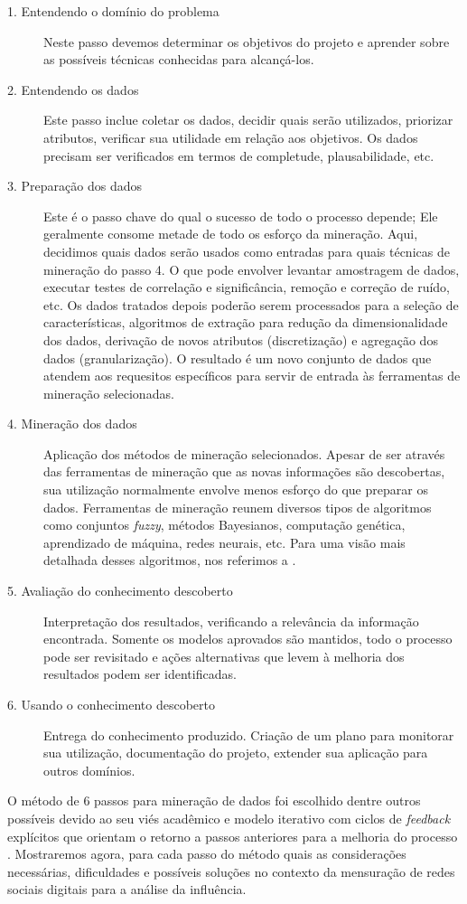 \documentclass{article}
\begin{document}
\begin{description}
\item[1. Entendendo o domínio do problema]Neste passo devemos determinar os
objetivos do projeto e aprender sobre as possíveis técnicas conhecidas
para alcançá-los.
\item[2. Entendendo os dados]Este passo inclue coletar os dados, decidir quais
serão utilizados, priorizar atributos, verificar sua utilidade em relação aos
objetivos. Os dados precisam ser verificados em termos de completude,
plausabilidade, etc.
\item[3. Preparação dos dados]Este é o passo chave do qual o sucesso de todo o
processo depende; Ele geralmente consome metade de todo os esforço da mineração.
Aqui, decidimos quais dados serão usados como entradas para quais técnicas de
mineração do passo 4. O que pode envolver levantar amostragem de dados, executar
testes de correlação e significância, remoção e correção de ruído, etc. Os dados
tratados depois poderão serem processados para a seleção de características,
algoritmos de extração para redução da dimensionalidade dos dados, derivação de
novos atributos (discretização) e agregação dos dados (granularização). O
resultado é um novo conjunto de dados que atendem aos requesitos específicos
para servir de entrada às ferramentas de mineração selecionadas.
\item[4. Mineração dos dados]Aplicação dos métodos de mineração selecionados.
Apesar de ser através das ferramentas de mineração que as novas informações
são descobertas, sua utilização normalmente envolve menos esforço do que
preparar os dados. Ferramentas de mineração reunem diversos tipos de algoritmos
como conjuntos \textit{fuzzy}, métodos Bayesianos, computação genética,
aprendizado de máquina, redes neurais, etc. Para uma visão mais detalhada desses
algoritmos, nos referimos a \cite{JiaweiHan2006}.
\item[5. Avaliação do conhecimento descoberto]Interpretação dos
resultados, verificando a relevância da informação encontrada. Somente os
modelos aprovados são mantidos, todo o processo pode ser revisitado e ações
alternativas que levem à melhoria dos resultados podem ser identificadas.
\item[6. Usando o conhecimento descoberto]Entrega do conhecimento produzido.
Criação de um plano para monitorar sua utilização, documentação do projeto,
extender sua aplicação para outros domínios.
\end{description}

O método de 6 passos para mineração de dados foi escolhido dentre outros
possíveis devido ao seu viés acadêmico e modelo iterativo com ciclos de
\textit{feedback} explícitos que orientam o retorno a passos anteriores para a
melhoria do processo \cite{KURGAN2006}. Mostraremos agora, para cada passo do
método quais as considerações necessárias, dificuldades e possíveis soluções no
contexto da mensuração de redes sociais digitais para a análise da influência.
\end{document}
